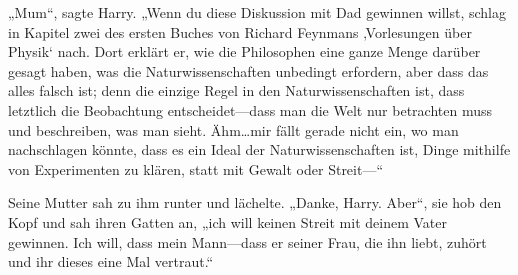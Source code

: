 „Mum“, sagte Harry. „Wenn du diese Diskussion mit Dad gewinnen willst, schlag in Kapitel zwei des ersten Buches von Richard Feynmans ‚Vorlesungen über Physik‘ nach. Dort erklärt er, wie die Philosophen eine ganze Menge darüber gesagt haben, was die Naturwissenschaften unbedingt erfordern, aber dass das alles falsch ist; denn die einzige Regel in den Naturwissenschaften ist, dass letztlich die Beobachtung entscheidet—dass man die Welt nur betrachten muss und beschreiben, was man sieht. Ähm…mir fällt gerade nicht ein, wo man nachschlagen könnte, dass es ein Ideal der Naturwissenschaften ist, Dinge mithilfe von Experimenten zu klären, statt mit Gewalt oder Streit—“%

Seine Mutter sah zu ihm runter und lächelte. „Danke, Harry. Aber“, sie hob den Kopf und sah ihren Gatten an, „ich will keinen Streit mit deinem Vater gewinnen. Ich will, dass mein Mann—dass er seiner Frau, die ihn liebt, zuhört und ihr dieses eine Mal vertraut.“

